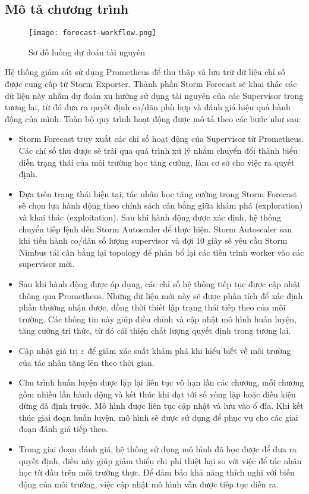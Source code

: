 \subsection{Mô tả chương trình}

\begin{figure}[htbp]
    \texttt{[image: forecast-workflow.png]}
    \caption{Sơ đồ luồng dự đoán tài nguyên}
\end{figure}

Hệ thống giám sát sử dụng Prometheus để thu thập và lưu trữ dữ liệu chỉ số được cung cấp từ Storm Exporter. Thành phần Storm Forecast sẽ khai thác các dữ liệu này nhằm dự đoán xu hướng sử dụng tài nguyên của các Supervisor trong tương lai, từ đó đưa ra quyết định co/dãn phù hợp và đánh giá hiệu quả hành động của mình. Toàn bộ quy trình hoạt động được mô tả theo các bước như sau:

\begin{itemize}
    \item Storm Forecast truy xuất các chỉ số hoạt động của Supervisor từ Prometheus. Các chỉ số thu được sẽ trải qua quá trình xử lý nhằm chuyển đổi thành biểu diễn trạng thái của môi trường học tăng cường, làm cơ sở cho việc ra quyết định.
    \item Dựa trên trạng thái hiện tại, tác nhân học tăng cường trong Storm Forecast sẽ chọn lựa hành động theo chính sách cân bằng giữa khám phá (exploration) và khai thác (exploitation). Sau khi hành động được xác định, hệ thống chuyển tiếp lệnh đến Storm Autoscaler để thực hiện. Storm Autoscaler sau khi tiến hành co/dãn số lượng supervisor và đợi 10 giây sẽ yêu cầu Storm Nimbus tái cân bằng lại topology để phân bổ lại các tiến trình worker vào các supervisor mới.
    \item Sau khi hành động được áp dụng, các chỉ số hệ thống tiếp tục được cập nhật thông qua Prometheus. Những dữ liệu mới này sẽ được phân tích để xác định phần thưởng nhận được, đồng thời thiết lập trạng thái tiếp theo của môi trường. Các thông tin này giúp điều chỉnh và cập nhật mô hình huấn luyện, tăng cường tri thức, từ đó cải thiện chất lượng quyết định trong tương lai.
    \item Cập nhật giá trị $\varepsilon$ để giảm xác suất khám phá khi hiểu biết về môi trường của tác nhân tăng lên theo thời gian.
    \item Chu trình huấn luyện được lặp lại liên tục vô hạn lần các chương, mỗi chương gồm nhiều lần hành động và kết thúc khi đạt tới số vòng lặp hoặc điều kiện dừng đã định trước. Mô hình được liên tục cập nhật và lưu vào ổ đĩa. Khi kết thúc giai đoạn huấn luyện, mô hình sẽ được sử dụng để phục vụ cho các giai đoạn đánh giá tiếp theo.
    \item Trong giai đoạn đánh giá, hệ thống sử dụng mô hình đã học được để đưa ra quyết định, điều này giúp giảm thiểu chi phí thiệt hại so với việc để tác nhân học từ đầu trên môi trường thực. Để đảm bảo khả năng thích nghi với biến động của môi trường, việc cập nhật mô hình vẫn được tiếp tục diễn ra.
\end{itemize}

